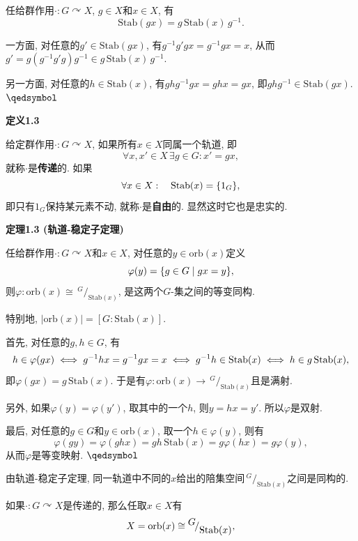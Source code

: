 \documentclass[UTF8]{ctexart}
\begin{document}
任给群作用$\cdot:G\curvearrowright X$, $g\in X$和$x\in X$, 有
\[
    \mathrm{Stab}(gx)=g\,\mathrm{Stab}(x)\,g^{-1}.
\]


一方面, 对任意的$g'\in\mathrm{Stab}(gx)$, 有$g^{-1}g'gx=g^{-1}gx=x$,
从而$g'=g(g^{-1}g'g)g^{-1}\in g\,\mathrm{Stab}(x)\,g^{-1}$.

另一方面, 对任意的$h\in\mathrm{Stab}(x)$, 有$ghg^{-1}gx=ghx=gx$,
即$ghg^{-1}\in\mathrm{Stab}(gx)$. \hfill $\qedsymbol$

\vspace{10pt}

\hypertarget{sec:定义1.3}{}
\noindent\textbf{定义1.3}

给定群作用$\cdot:G\curvearrowright X$, 如果所有$x\in X$同属一个轨道, 即
\[
    \forall x,x'\in X\,\exists g\in G:x'=gx,
\]
就称$\cdot$是\textbf{传递}的. 如果
\[
    \forall x\in X:\quad\mathrm{Stab}(x)=\{1_G\},\\[-3pt]
\]
即只有$1_G$保持某元素不动, 就称$\cdot$是\textbf{自由}的.
显然这时它也是忠实的.





\newpage

\hypertarget{sec:定理1.3}{}
\noindent\textbf{定理1.3 (轨道-稳定子定理)}

任给群作用$\cdot:G\curvearrowright X$和$x\in X$,
对任意的$y\in\mathrm{orb}(x)$定义
\[
    \varphi(y)=\{g\in G\mid gx=y\},\\[3pt]
\]
则$\varphi:\mathrm{orb}(x)\cong\,\!^{\displaystyle G}\!
/_{\displaystyle\mathrm{Stab}(x)}$, 是这两个$G$-集之间的等变同构.

\vspace{5pt}
特别地, $|\mathrm{orb}(x)|=[G:\mathrm{Stab}(x)]$.

\vspace{3pt}

首先, 对任意的$g,h\in G$, 有
\[
    h\in\varphi(gx)\iff g^{-1}hx=g^{-1}gx=x\iff
    g^{-1}h\in\mathrm{Stab}(x)\iff h\in g\,\mathrm{Stab}(x),\\[3pt]
\]
即$\varphi(gx)=g\,\mathrm{Stab}(x)$.
于是有$\varphi:\mathrm{orb}(x)\to\,\!^{\displaystyle G}\!
/_{\displaystyle\mathrm{Stab}(x)}$且是满射.

\vspace{3pt}
另外, 如果$\varphi(y)=\varphi(y')$, 取其中的一个$h$,
则$y=hx=y'$. 所以$\varphi$是双射.

最后, 对任意的$g\in G$和$y\in\mathrm{orb}(x)$, 取一个$h\in\varphi(y)$, 则有
\[
    \varphi(gy)=\varphi(ghx)=gh\,\mathrm{Stab}(x)=g\varphi(hx)=g\varphi(y),
\]
从而$\varphi$是等变映射. \hfill $\qedsymbol$

\vspace{15pt}

由轨道-稳定子定理, 同一轨道中不同的$x$给出的陪集空间$\,\!^{\displaystyle G}\!
/_{\displaystyle\mathrm{Stab}(x)}$之间是同构的.

\vspace{3pt}
如果$\cdot:G\curvearrowright X$是传递的, 那么任取$x\in X$有
\vspace{3pt}
\[
    X=\mathrm{orb}(x)\cong\,\!^{\displaystyle G}\!
    /_{\displaystyle\mathrm{Stab}(x)},\\[3pt]
\]
\end{document}
